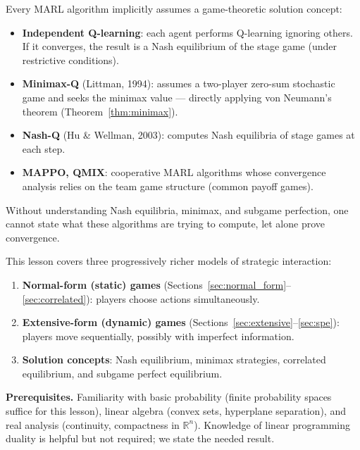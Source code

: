 \documentclass[11pt,a4paper]{article}
\theoremstyle{definition}
\theoremstyle{plain}
\theoremstyle{remark}
\newcommand{\R}{\mathbb{R}}
\begin{document}
\begin{rlconnection}
Every MARL algorithm implicitly assumes a game-theoretic solution concept:
\begin{itemize}[nosep]
    \item \textbf{Independent Q-learning}: each agent performs Q-learning ignoring
    others. If it converges, the result is a Nash equilibrium of the stage game
    (under restrictive conditions).
    \item \textbf{Minimax-Q} (Littman, 1994): assumes a two-player zero-sum
    stochastic game and seeks the minimax value --- directly applying
    von Neumann's theorem (Theorem~\ref{thm:minimax}).
    \item \textbf{Nash-Q} (Hu \& Wellman, 2003): computes Nash equilibria of
    stage games at each step.
    \item \textbf{MAPPO, QMIX}: cooperative MARL algorithms whose convergence
    analysis relies on the team game structure (common payoff games).
\end{itemize}
Without understanding Nash equilibria, minimax, and subgame perfection, one cannot
state what these algorithms are trying to compute, let alone prove convergence.
\end{rlconnection}

This lesson covers three progressively richer models of strategic interaction:
\begin{enumerate}[nosep]
    \item \textbf{Normal-form (static) games} (Sections~\ref{sec:normal_form}--\ref{sec:correlated}):
    players choose actions simultaneously.
    \item \textbf{Extensive-form (dynamic) games} (Sections~\ref{sec:extensive}--\ref{sec:spe}):
    players move sequentially, possibly with imperfect information.
    \item \textbf{Solution concepts}: Nash equilibrium, minimax strategies, correlated
    equilibrium, and subgame perfect equilibrium.
\end{enumerate}

\noindent\textbf{Prerequisites.} Familiarity with basic probability (finite probability
spaces suffice for this lesson), linear algebra (convex sets, hyperplane separation),
and real analysis (continuity, compactness in $\R^n$). Knowledge of linear programming
duality is helpful but not required; we state the needed result.

\end{document}
